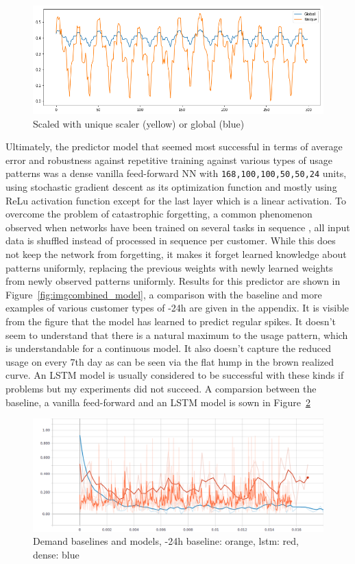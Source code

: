 \begin{figure}[]
    \centering
    \includegraphics[width=1.0\linewidth]{img/frosty_scaled.png}
    \caption{Scaled with unique scaler (yellow) or global (blue)}
    \label{fig:imgfrosty}
\end{figure}

Ultimately, the predictor model that seemed most successful in terms of average error and robustness against repetitive
training against various types of usage patterns was a dense vanilla feed-forward \ac{NN} with
\texttt{168,100,100,50,50,24} units, using stochastic gradient descent as its optimization function and mostly using
\ac{ReLu} activation function except for the last layer which is a linear activation. To overcome the problem of
catastrophic forgetting, a common phenomenon observed when networks have been trained on several tasks in sequence
\cite[]{french1999catastrophic}, all input data is shuffled instead of processed in sequence per customer. While this
does not keep the network from forgetting, it makes it forget learned knowledge about patterns uniformly, replacing the
previous weights with newly learned weights from newly observed patterns uniformly. Results for this predictor are shown
in Figure~\ref{fig:imgcombined_model}, a comparison with the baseline and more examples of various customer types of
-24h are given in the appendix. It is visible from the figure that the model has learned to predict regular
spikes. It doesn't seem to understand that there is a natural maximum to the usage pattern, which is understandable for
a continuous model. It also doesn't capture the reduced usage on every 7th day as can be seen via the flat hump
in the brown realized curve. An \ac{LSTM} model is usually considered to be successful with these kinds if problems but
my experiments did not succeed. A comparsion between the baseline, a vanilla feed-forward and an \ac{LSTM} model is sown
in Figure~\ref{fig:baseline_dense}

\begin{figure}[]
    \centering
    \includegraphics[width=1.0\linewidth]{img/demand_baselines_2.png}
    \caption{Demand baselines and models, -24h baseline: orange, lstm: red, dense: blue}
    \label{fig:baseline_dense}
\end{figure}


